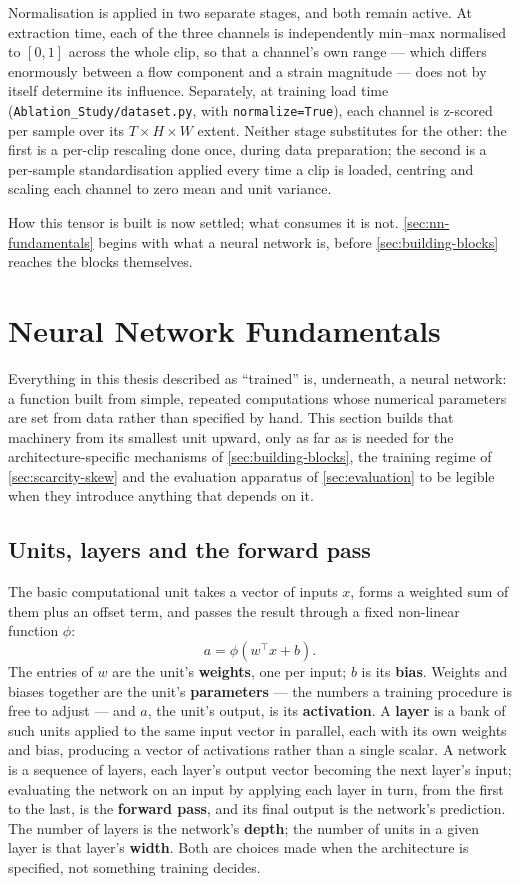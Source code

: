 Normalisation is applied in two separate stages, and both remain active. At extraction time, each of the three channels is independently min--max normalised to $[0, 1]$ across the whole clip, so that a channel's own range --- which differs enormously between a flow component and a strain magnitude --- does not by itself determine its influence. Separately, at training load time (\texttt{Ablation\_Study/dataset.py}, with \texttt{normalize=True}), each channel is z-scored per sample over its $T \times H \times W$ extent. Neither stage substitutes for the other: the first is a per-clip rescaling done once, during data preparation; the second is a per-sample standardisation applied every time a clip is loaded, centring and scaling each channel to zero mean and unit variance.

How this tensor is built is now settled; what consumes it is not. \autoref{sec:nn-fundamentals} begins with what a neural network is, before \autoref{sec:building-blocks} reaches the blocks themselves.


\section{Neural Network Fundamentals}
\label{sec:nn-fundamentals}

Everything in this thesis described as ``trained'' is, underneath, a neural network: a function built from simple, repeated computations whose numerical parameters are set from data rather than specified by hand. This section builds that machinery from its smallest unit upward, only as far as is needed for the architecture-specific mechanisms of \autoref{sec:building-blocks}, the training regime of \autoref{sec:scarcity-skew} and the evaluation apparatus of \autoref{sec:evaluation} to be legible when they introduce anything that depends on it.

\subsection{Units, layers and the forward pass}
\label{sec:units-layers}

The basic computational unit takes a vector of inputs $x$, forms a weighted sum of them plus an offset term, and passes the result through a fixed non-linear function $\phi$:
\[
	a = \phi(w^\top x + b).
\]
The entries of $w$ are the unit's \textbf{weights}, one per input; $b$ is its \textbf{bias}. Weights and biases together are the unit's \textbf{parameters} --- the numbers a training procedure is free to adjust --- and $a$, the unit's output, is its \textbf{activation}. A \textbf{layer} is a bank of such units applied to the same input vector in parallel, each with its own weights and bias, producing a vector of activations rather than a single scalar. A network is a sequence of layers, each layer's output vector becoming the next layer's input; evaluating the network on an input by applying each layer in turn, from the first to the last, is the \textbf{forward pass}, and its final output is the network's prediction. The number of layers is the network's \textbf{depth}; the number of units in a given layer is that layer's \textbf{width}. Both are choices made when the architecture is specified, not something training decides.

